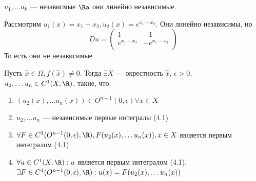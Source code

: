 \begin{note}
    \(u_1, \dots u_k\) --- независмые \(\Ra \) они линейно независимые.
\end{note}

\begin{example}
    Рассмотрим \(u_1(x) = x_1 - x_2, u_2(x) = e^{x_1 - x_2}\). Они линейно независимы, но 
    \[Du = \left( \begin{array}{cc}
        1 & -1 \\
        e^{x_1 - x_2} & -e^{x_1 - x_2} \\ 
    \end{array} \right)\]
    То есть они не независимые
\end{example}

\begin{theorem}
    Пусть \(\hat{x} \in \Omega, f(\hat{x}) \ne 0\). Тогда \(\exists X\) --- окрестность \(\hat{x}\), \(\epsilon > 0\), \(u_2, \dots u_n \in C^1(X, \R)\), такие, что:
    \begin{enumerate}
        \item \((u_2(x), \dots u_n(x)) \in O^{n - 1}(0, \epsilon) \forall x \in X\)
        \item \(u_2, \dots u_n\) --- независимые первые интегралы (4.1)
        \item \(\forall F \in C^1(O^{n - 1}(0, \epsilon), \R), F(u_2(x), \dots u_n(x)), x \in X\) является первым интегралом (4.1)
        \item \(\forall u \in C^1(X, \R): u\) является первым интегралом (4.1), \(\exists F \in C^1(O^{n - 1}(0, \epsilon), \R): u(x) = F(u_2(x), \dots u_n(x))\)
    \end{enumerate}
\end{theorem}

